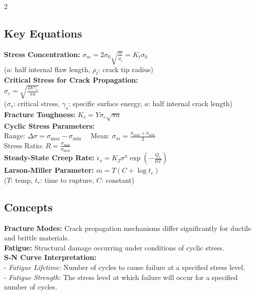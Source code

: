 \documentclass[8pt]{article}
\begin{document}
\begin{multicols*}{2}
  \subsection*{Key Equations}
  \textbf{Stress Concentration:} \( \sigma_m = 2\sigma_0 \sqrt{\frac{a}{\rho_t}} = K_t \sigma_0 \) \\
  (\( a \): half internal flaw length, \( \rho_t \): crack tip radius) \\

  \textbf{Critical Stress for Crack Propagation:} \\
  \( \sigma_c = \sqrt{\frac{2E\gamma_s}{\pi a}} \) \\
  (\( \sigma_c \): critical stress, \( \gamma_s \): specific surface energy, \( a \): half internal crack length) \\

  \textbf{Fracture Toughness:} \( K_c = Y \sigma_c \sqrt{\pi a} \) \\

  \textbf{Cyclic Stress Parameters:} \\
  Range: \( \Delta\sigma = \sigma_{\max} - \sigma_{\min} \) \ \ Mean: \( \sigma_m = \frac{\sigma_{\max} + \sigma_{\min}}{2} \) \\
  Stress Ratio: \( R = \frac{\sigma_{\min}}{\sigma_{\max}} \) \\

  \textbf{Steady-State Creep Rate:} \( \dot{\epsilon}_s = K_2 \sigma^n \exp\left(-\frac{Q_c}{RT}\right) \) \\

  \textbf{Larson-Miller Parameter:} \( m = T(C + \log t_r) \) \\
  (\( T \): temp, \( t_r \): time to rupture, \( C \): constant)

  \subsection*{Concepts}
  \textbf{Fracture Modes:} Crack propagation mechanisms differ significantly for ductile and brittle materials. \\
  \textbf{Fatigue:} Structural damage occurring under conditions of cyclic stress. \\
  \textbf{S-N Curve Interpretation:} \\
  - \textit{Fatigue Lifetime:} Number of cycles to cause failure at a specified stress level. \\
  - \textit{Fatigue Strength:} The stress level at which failure will occur for a specified number of cycles.

\end{multicols*}
\end{document}
